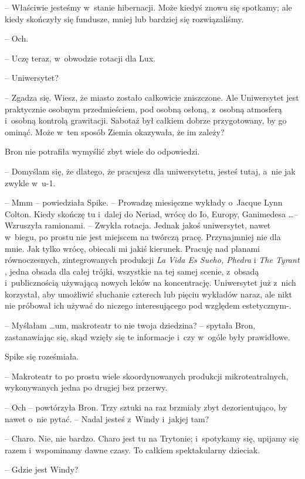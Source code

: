 \documentclass[oneside,polish,11pt,rmheadings]{mwbk}
\begin{document}
-- Właściwie jesteśmy w~stanie hibernacji. Może kiedyś znowu się spotkamy; ale kiedy skończyły się fundusze, mniej lub bardziej się rozwiązaliśmy. 

-- Och. 

-- Uczę teraz,  w~obwodzie rotacji dla Lux. 

-- Uniwersytet?  

 -- Zgadza się. Wiesz, że miasto zostało całkowicie zniszczone. Ale Uniwersytet jest praktycznie osobnym przedmieściem, pod osobną osłoną, z~osobną atmosferą i~osobną kontrolą grawitacji. Sabotaż był całkiem dobrze przygotowany, by go ominąć. Może w~ten sposób Ziemia okazywała, że im zależy? 

Bron nie potrafiła wymyślić zbyt wiele do odpowiedzi. 

-- Domyślam się, że dlatego, że pracujesz dla uniwersytetu, jesteś tutaj, a~nie jak zwykle w~u-1. 

-- Mmm -- powiedziała Spike. -- Prowadzę miesięczne wykłady o~Jacque Lynn Colton. Kiedy skończę tu i~dalej do Neriad, wrócę do Io, Europy, Ganimedesa \ldots  -- Wzruszyła ramionami. -- Zwykła rotacja. Jednak jakoś uniwersytet, nawet w~biegu, po prostu nie jest miejscem na twórczą pracę. Przynajmniej nie dla mnie. Jak tylko wrócę, obiecali mi jakiś kierunek. Pracuję nad planami równoczesnych, zintegrowanych produkcji \textit{La Vida Es Sueho, Phedra }i \textit{The Tyrant }, jedna obsada dla całej trójki, wszystkie na tej samej scenie, z~obsadą i~publicznością używającą nowych leków na koncentrację. Uniwersytet już z~nich korzystał, aby umożliwić słuchanie czterech lub pięciu wykładów naraz, ale nikt nie próbował ich używać do niczego interesującego pod względem estetycznym-. 

-- Myślałam \ldots  um, makroteatr to nie twoja dziedzina? -- spytała Bron, zastanawiając się, skąd wzięły się te informacje i~czy w~ogóle były prawidłowe. 

Spike się roześmiała. 

-- Makroteatr to po prostu wiele skoordynowanych produkcji mikroteatralnych, wykonywanych jedna po drugiej bez przerwy. 

-- Och -- powtórzyła Bron. Trzy sztuki na raz brzmiały zbyt dezorientująco, by nawet o~nie pytać. -- Nadal jesteś z~Windy i~jak\dywiz jej \dywiz tam? 

-- Charo. Nie, nie bardzo. Charo jest tu na Trytonie; i~spotykamy się, upijamy się razem i~wspominamy dawne czasy. To całkiem spektakularny dzieciak. 

-- Gdzie jest Windy?  
\end{document}
